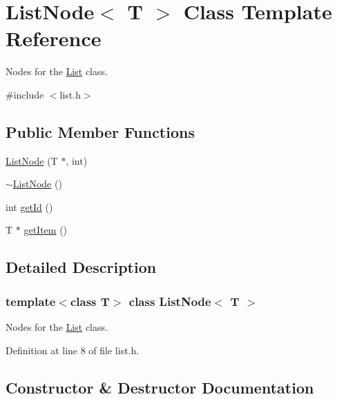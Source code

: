 \hypertarget{classListNode}{}\section{List\+Node$<$ T $>$ Class Template Reference}
\label{classListNode}


Nodes for the \hyperlink{classList}{List} class.  




{\ttfamily \#include $<$list.\+h$>$}

\subsection*{Public Member Functions}
\begin{DoxyCompactItemize}
\item 
\hyperlink{classListNode_a65b56c0f9130997a6c88c02c06a40b84}{List\+Node} (T $\ast$, int)
\item 
\hyperlink{classListNode_abe41245574baa42781b71f70e49fd06b}{$\sim$\+List\+Node} ()
\item 
int \hyperlink{classListNode_a38a21e03d0174e0f9ab38495e25bafbf}{get\+Id} ()
\item 
T $\ast$ \hyperlink{classListNode_addc19839da16898dbc1d8abfd8ec5dcd}{get\+Item} ()
\end{DoxyCompactItemize}


\subsection{Detailed Description}
\subsubsection*{template$<$class T$>$\newline
class List\+Node$<$ T $>$}

Nodes for the \hyperlink{classList}{List} class. 

Definition at line 8 of file list.\+h.



\subsection{Constructor \& Destructor Documentation}
\mbox{\label{classListNode_a65b56c0f9130997a6c88c02c06a40b84}} 
